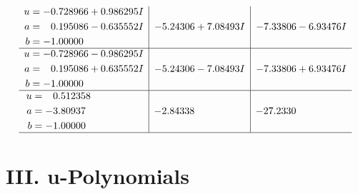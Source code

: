\documentclass[1p]{elsarticle_modified}
\theoremstyle{definition}
\begin{document}
$$\begin{array}{c|c|c}
\begin{aligned}
u &= -0.728966 + 0.986295 I \\
a &= \phantom{-}0.195086 - 0.635552 I \\
b &= -1.00000\phantom{ +0.000000I}\end{aligned}
 & -5.24306 + 7.08493 I & -7.33806 - 6.93476 I \\ \hline\begin{aligned}
u &= -0.728966 - 0.986295 I \\
a &= \phantom{-}0.195086 + 0.635552 I \\
b &= -1.00000\phantom{ +0.000000I}\end{aligned}
 & -5.24306 - 7.08493 I & -7.33806 + 6.93476 I \\ \hline\begin{aligned}
u &= \phantom{-}0.512358\phantom{ +0.000000I} \\
a &= -3.80937\phantom{ +0.000000I} \\
b &= -1.00000\phantom{ +0.000000I}\end{aligned}
 & -2.84338\phantom{ +0.000000I} & -27.2330\phantom{ +0.000000I}\\
 \hline 
 \end{array}$$\newpage
\newpage\renewcommand{\arraystretch}{1}
\centering \section*{ III. u-Polynomials}
\end{document}
